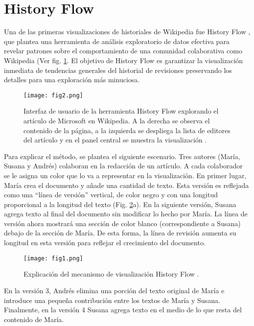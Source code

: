 \section{History Flow}
Una de las primeras visualizaciones de historiales de Wikipedia fue History Flow \cite{Vie04}, que plantea una herramienta de análisis exploratorio de datos efectiva para revelar patrones sobre el comportamiento de una comunidad colaborativa como Wikipedia (Ver fig. \ref{fig:fig2}. El objetivo de History Flow es garantizar la visualización inmediata de tendencias generales del historial de revisiones preservando los detalles para una exploración más minuciosa.

\begin{figure}[htp]
  \centering
  \texttt{[image: fig2.png]}
  \caption[Interfaz de usuario de la herramienta History Flow]{Interfaz de usuario de la herramienta History Flow explorando el artículo de Microsoft en Wikipedia. A la derecha se observa el contenido de la página, a la izquierda se despliega la lista de editores del artículo y en el panel central se muestra la visualización \cite[Fig. 3]{Vie04}.}
  \label{fig:fig2}
\end{figure}

Para explicar el método, se plantea el siguiente escenario. Tres autores (María, Susana y Andrés) colaboran en la redacción de un artículo. A cada colaborador se le asigna un color que lo va a representar en la visualización. En primer lugar, María crea el documento y añade una cantidad de texto. Esta versión es reflejada como una “línea de versión” vertical, de color negro y con una longitud proporcional a la longitud del texto (Fig. \ref{fig:fig1}a). En la siguiente versión, Susana agrega texto al final del documento sin modificar lo hecho por María. La línea de versión ahora mostrará una sección de color blanco (correspondiente a Susana) debajo de la sección de María. De esta forma, la línea de revisión aumenta su longitud en esta versión para reflejar el crecimiento del documento.

\begin{figure}[htp]
  \centering
  \texttt{[image: fig1.png]}
  \caption[Explicación del mecanismo de visualización History Flow]{Explicación del mecanismo de visualización History Flow \cite[Fig. 2]{Vie04}.}
  \label{fig:fig1}
\end{figure}

En la versión 3, Andrés elimina una porción del texto original de María e introduce una pequeña contribución entre los textos de María y Susana. Finalmente, en la versión 4 Susana agrega texto en el medio de lo que resta del contenido de María.

